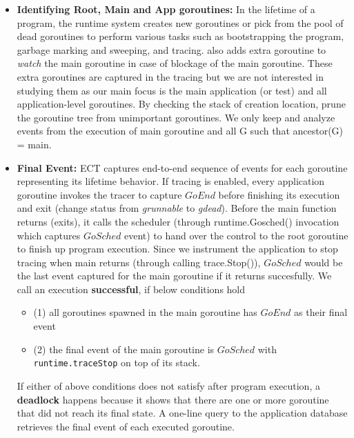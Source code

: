 \begin{itemize}
  \item \textbf{Identifying Root, Main and App goroutines:}
  In the lifetime of a program, the runtime system creates new goroutines or pick from the pool of dead goroutines to perform various tasks such as bootstrapping the program, garbage marking and sweeping, and tracing.
  \goat also adds extra goroutine to \textit{watch} the main goroutine in case of blockage of the main goroutine.
  These extra goroutines are captured in the tracing but we are not interested in studying them as our main focus is the main application (or test) and all application-level goroutines.
  By checking the stack of creation location, \goat prune the goroutine tree from unimportant goroutines.
  We only keep and analyze events from the execution of main goroutine and all G such that ancestor(G) = main.
  \item \textbf{Final Event:}
  ECT captures end-to-end sequence of events for each goroutine representing its lifetime behavior.
  If tracing is enabled, every application goroutine invokes the tracer to capture $GoEnd$ before finishing its execution and exit (change status from \textit{grunnable} to \textit{gdead})\cite{goexit-line-of-code}.
  Before the main function returns (\ie exits), it calls the scheduler (through runtime.Gosched() invocation which captures $GoSched$ event) to hand over the control to the root goroutine to finish up program execution.
  Since we instrument the application to stop tracing when main returns (through calling trace.Stop()), $GoSched$ would be the last event captured for the main goroutine if it returns succesfully.
  We call an execution \textbf{successful}, if below conditions hold
  \begin{itemize}
    \item (1) all goroutines spawned in the main goroutine has $GoEnd$ as their final event
    \item (2) the final event of the main goroutine is $GoSched$ with \texttt{runtime.traceStop} on top of its stack.
  \end{itemize}
  If either of above conditions does not satisfy after program execution, a \textbf{deadlock} happens because it shows that there are one or more goroutine that did not reach its final state.
  A one-line query to the application database retrieves the final event of each executed goroutine.

\end{itemize}
